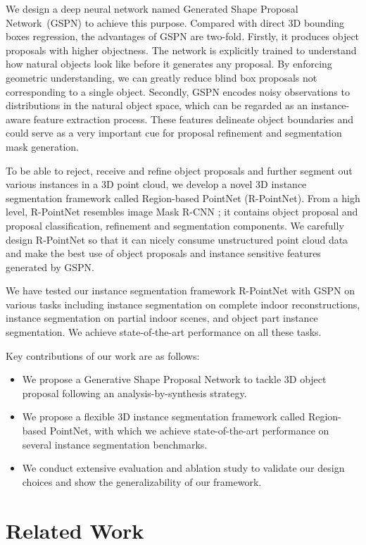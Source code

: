 \documentclass[10pt,twocolumn,letterpaper]{article}
\begin{document}
We design a deep neural network named Generated Shape Proposal Network~(GSPN) to achieve this purpose. Compared with direct 3D bounding boxes regression, the advantages of GSPN are two-fold. Firstly, it produces object proposals with higher objectness. The network is explicitly trained to understand how natural objects look like before it generates any proposal. By enforcing geometric understanding, we can greatly reduce blind box proposals not corresponding to a single object. Secondly, GSPN encodes noisy observations to distributions in the natural object space, which can be regarded as an instance-aware feature extraction process. These features delineate object boundaries and could serve as a very important cue for proposal refinement and segmentation mask generation.

To be able to reject, receive and refine object proposals and further segment out various instances in a 3D point cloud, we develop a novel 3D instance segmentation framework called Region-based PointNet (R-PointNet). From a high level, R-PointNet resembles image Mask R-CNN \cite{he2017mask}; it contains object proposal and proposal classification, refinement and segmentation components. We carefully design R-PointNet so that it can nicely consume unstructured point cloud data and make the best use of object proposals and instance sensitive features generated by GSPN.

We have tested our instance segmentation framework R-PointNet with GSPN on various tasks including instance segmentation on complete indoor reconstructions, instance segmentation on partial indoor scenes, and object part instance segmentation. We achieve state-of-the-art performance on all these tasks.

Key contributions of our work are as follows:
\begin{itemize}
\setlength\itemsep{-0.2em}
    \item We propose a Generative Shape Proposal Network to tackle 3D object proposal following an analysis-by-synthesis strategy.
    \item We propose a flexible 3D instance segmentation framework called Region-based PointNet, with which we achieve state-of-the-art performance on several instance segmentation benchmarks.
    \item We conduct extensive evaluation and ablation study to validate our design choices and show the generalizability of our framework.
\end{itemize}
%
 
\section{Related Work}
\end{document}
